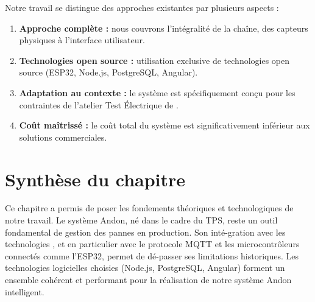 Notre travail se distingue des approches existantes par plusieurs aspects :

\begin{enumerate}
    \item \textbf{Approche complète :} nous couvrons l'intégralité de la chaîne, des capteurs physiques à l'interface utilisateur.
    \item \textbf{Technologies open source :} utilisation exclusive de technologies open source (ESP32, Node.js, PostgreSQL, Angular).
    \item \textbf{Adaptation au contexte :} le syst\`eme est sp\'ecifiquement con\c{c}u pour les contraintes de l'atelier Test \'Electrique de \sews.
    \item \textbf{Co\^ut ma\^itriss\'e :} le co\^ut total du syst\`eme est significativement inf\'erieur aux solutions commerciales.
\end{enumerate}

\section{Synth\`ese du chapitre}

Ce chapitre a permis de poser les fondements th\'eoriques et technologiques de notre travail. Le syst\`eme Andon, n\'e dans le cadre du TPS, reste un outil fondamental de gestion des pannes en production. Son int\'e-gration avec les technologies \iiot, et en particulier avec le protocole MQTT et les microcontr\^oleurs connect\'es comme l'ESP32, permet de d\'e-passer ses limitations historiques. Les technologies logicielles choisies (Node.js, PostgreSQL, Angular) forment un ensemble coh\'erent et performant pour la r\'ealisation de notre syst\`eme Andon intelligent.
